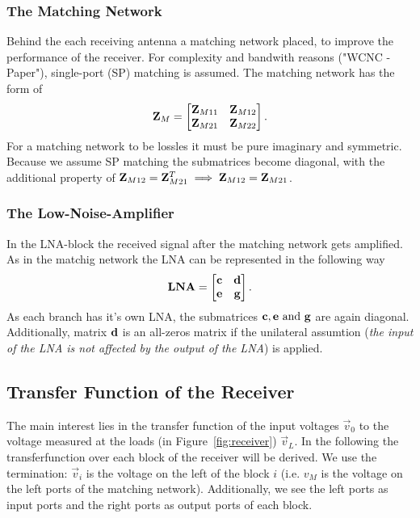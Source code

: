\subsubsection{The Matching Network}
\label{sec:matching_network}
Behind the each receiving antenna a matching network placed, to improve the performance of the receiver.
For complexity and bandwith reasons ("WCNC - Paper"), single-port (SP) matching is assumed.
The matching network has the form of 
\begin{equation}
\mathbf{Z}_M=
\begin{bmatrix}
\mathbf{Z}_{M11} & \mathbf{Z}_{M12} \\
\mathbf{Z}_{M21} & \mathbf{Z}_{M22}
\end{bmatrix}.
\end{equation}
For a matching network to be lossles it must be pure imaginary and symmetric\cite{Nossek}.
Because we assume SP matching the submatrices become diagonal, with the additional property of $\mathbf{Z}_{M12} = \mathbf{Z}_{M21}^T \implies \mathbf{Z}_{M12} = \mathbf{Z}_{M21}$.


\subsubsection{The Low-Noise-Amplifier}
\label{sec:lna}
In the LNA-block the received signal after the matching network gets amplified.
As in the matchig network the LNA can be represented in the following way
\begin{equation}
\mathbf{LNA}=
\begin{bmatrix}
\mathbf{c} & \mathbf{d} \\
\mathbf{e} & \mathbf{g}
\end{bmatrix}.
\end{equation}
As each branch has it's own LNA, the submatrices $\mathbf{c},\mathbf{e}\text{ and }\mathbf{g}$ are again diagonal.
Additionally, matrix $\mathbf{d}$ is an all-zeros matrix if the unilateral assumtion (\textit{the input of the LNA is not affected by the output of the LNA}) is applied.

\subsection{Transfer Function of the Receiver}
\label{sec:transf}
The main interest lies in the transfer function of the input voltages $\vec{v}_0$ to the voltage measured at the loads (in Figure~\ref{fig:receiver}) $\vec{v}_L$.
In the following the transferfunction over each block of the receiver will be derived.
We use the termination: $\vec{v}_i$ is the voltage on the left of the block $i$ (i.e. $v_{M}$ is the voltage on the left ports of the matching network).
Additionally, we see the left ports as input ports and the right ports as output ports of each block.

